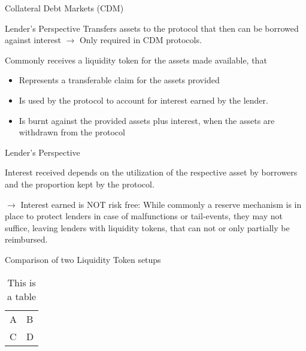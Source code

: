 \documentclass[handout]{beamer}
\begin{document}
\begin{frame}{Collateral Debt Markets (CDM)}

	
\end{frame}


\begin{frame}{Lender's Perspective}
Transfers assets to the protocol that then can be borrowed against interest $\rightarrow$  Only required in CDM protocols.

\vspace{1em}

Commonly receives a liquidity token for the assets made available, that

\vspace{1em}

\begin{itemize}
  \item Represents a transferable claim for the assets provided
  \item Is used by the protocol to account for interest earned by the lender.
  \item Is burnt against the provided assets plus interest, when the assets are withdrawn from the protocol
\end{itemize}


\end{frame}


\begin{frame}{Lender's Perspective}

Interest received depends on the utilization of the respective asset by borrowers and the proportion kept by the protocol.


$\rightarrow $ Interest earned is NOT risk free: While commonly a reserve mechanism is in place to protect lenders in case of malfunctions or tail-events, they may not suffice, leaving lenders with liquidity tokens, that can not or only partially be reimbursed.


\end{frame}



\begin{frame}{Comparison of two Liquidity Token setups}

	\begin{table}
		\begin{tabular}{ll}
			A & B\\
			C & D
		\end{tabular}
		\caption{This is a table}
		\label{tbl:simpletable}
	\end{table}
	
\end{frame}
\end{document}

